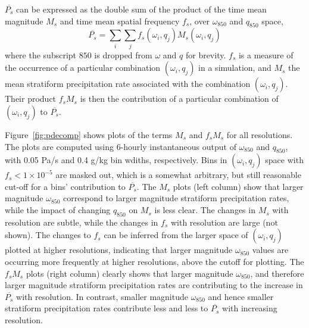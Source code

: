 \documentclass[times]{qjrms4}
\begin{document}
$\overline{P_s}$ can be expressed as the double sum of the product of the time mean magnitude $M_s$ and time mean spatial frequency $f_s$, over $\omega_{850}$ and $q_{850}$ space,
\begin{equation}
\overline{P_{s}} = \sum_i \sum_j f_s \left( \omega_i , q_j \right) M_s \left( \omega_i , q_j \right) \label{eq:pdecomp}
\end{equation}
where the subscript $850$ is dropped from $\omega$ and $q$ for brevity. $f_s$ is a measure of the occurrence of a particular combination $\left( \omega_i , q_j \right)$ in a simulation, and $M_s$ the mean stratiform precipitation rate associated with the combination $\left( \omega_i , q_j \right)$. Their product $f_s M_s$ is then the contribution of a particular combination of $\left( \omega_i , q_j \right)$ to $\overline{P_s}$.

Figure~\ref{fig:pdecomp} shows plots of the terms $M_s$ and $f_s M_s$ for all resolutions. The plots are computed using 6-hourly instantaneous output of $\omega_{850}$ and $q_{850}$, with 0.05 Pa/s and 0.4 g/kg bin wdiths, respectively. Bins in  $\left( \omega_{i} , q_{j} \right)$ space with $f_s <1 \times 10^{-5}$ are masked out, which is a somewhat arbitrary, but still reasonable cut-off for a bins' contribution to $\overline{P_s}$. The $M_s$ plots (left column) show that larger magnitude $\omega_{850}$ correspond to larger magnitude stratiform precipitation rates, while the impact of changing $q_{850}$ on $M_s$ is less clear. The changes in $M_s$ with resolution are subtle, while the changes in $f_s$ with resolution are large (not shown). The changes to $f_s$ can be inferred from the larger space of $\left( \omega_i , q_j \right)$ plotted at higher resolutions, indicating that larger magnitude $\omega_{850}$ values are occurring more frequently at higher resolutions, above the cutoff for plotting. The $f_s M_s$ plots (right column) clearly shows that larger magnitude $\omega_{850}$, and therefore larger magnitude stratiform precipitation rates are contributing to the increase in $\overline{P_s}$ with resolution. In contrast, smaller magnitude $\omega_{850}$ and hence smaller stratiform precipitation rates contribute less and less to $\overline{P_s}$ with increasing resolution.
\end{document}
